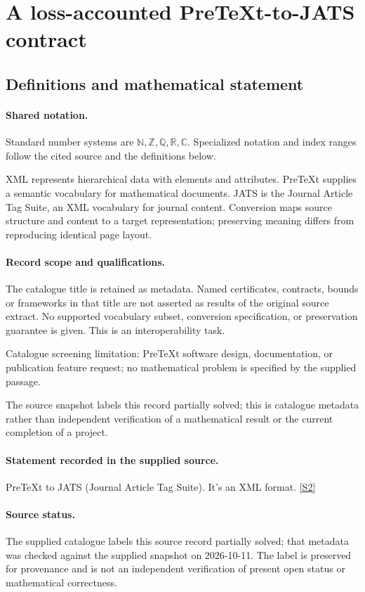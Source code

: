 \documentclass[11pt]{article}
\newcommand{\sref}[2]{\hyperlink{source:#1:#2}{[S#2]}}
\begin{document}
\section{A loss-accounted PreTeXt-to-JATS contract}\label{statement}

\subsection{Definitions and mathematical statement}

\paragraph{Shared notation.}Standard number systems are $\mathbb N,\mathbb Z,\mathbb Q,\mathbb R,\mathbb C$. Specialized notation and index ranges follow the cited source and the definitions below.


XML represents hierarchical data with elements and attributes. PreTeXt supplies a semantic vocabulary for mathematical documents. JATS is the Journal Article Tag Suite, an XML vocabulary for journal content. Conversion maps source structure and content to a target representation; preserving meaning differs from reproducing identical page layout.
\paragraph{Record scope and qualifications.}
The catalogue title is retained as metadata. Named certificates, contracts, bounds or frameworks in that title are not asserted as results of the original source extract.
No supported vocabulary subset, conversion specification, or preservation guarantee is given. This is an interoperability task.

Catalogue screening limitation: PreTeXt software design, documentation, or publication feature request; no mathematical problem is specified by the supplied passage.

The source snapshot labels this record partially solved; this is catalogue metadata rather than independent verification of a mathematical result or the current completion of a project.
\paragraph{Statement recorded in the supplied source.}
PreTeXt to JATS (Journal Article Tag Suite). It's an XML format. \sref{statement}{2}
\paragraph{Source status.}
The supplied catalogue labels this source record partially solved; that metadata was checked against the supplied snapshot on 2026-10-11. The label is preserved for provenance and is not an independent verification of present open status or mathematical correctness.
\end{document}
